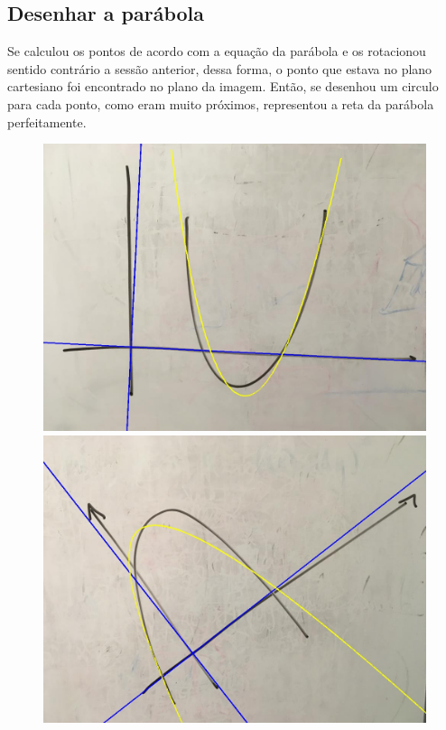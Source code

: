 \documentclass{article}
\begin{document}
\subsection{Desenhar a parábola}

Se calculou os pontos de acordo com a equação da parábola e os rotacionou sentido contrário a sessão anterior, dessa forma, o ponto que estava no plano cartesiano foi encontrado no plano da imagem. Então, se desenhou um circulo para cada ponto, como eram muito próximos, representou a reta da parábola perfeitamente.

\begin{figure}[h!]
   \centering
    \subfigure
        {\includegraphics[scale=0.2]{exemplo1ParaboleImage.jpg}}
    \subfigure
        {\includegraphics[scale=0.2]{exemplo2ParaboleImage.jpg}}

\end{figure}
\end{document}
